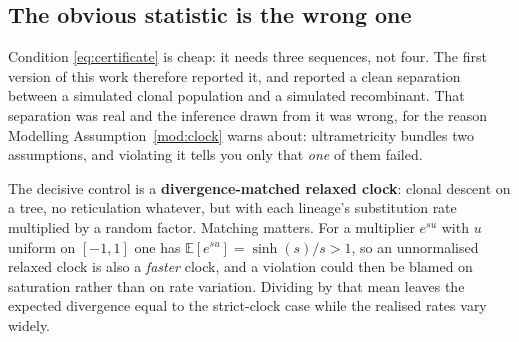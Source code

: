 \subsection{The obvious statistic is the wrong one}\label{sub:relaxed}

Condition \eqref{eq:certificate} is cheap: it needs three sequences, not four.
The first version of this work therefore reported it, and reported a clean
separation between a simulated clonal population and a simulated recombinant.
That separation was real and the inference drawn from it was wrong, for the
reason Modelling Assumption~\ref{mod:clock} warns about: ultrametricity bundles
two assumptions, and violating it tells you only that \emph{one} of them failed.

The decisive control is a \textbf{divergence-matched relaxed clock}: clonal
descent on a tree, no reticulation whatever, but with each lineage's substitution
rate multiplied by a random factor. Matching matters. For a multiplier
$e^{s u}$ with $u$ uniform on $[-1,1]$ one has
$\mathbb{E}[e^{su}] = \sinh(s)/s > 1$, so an unnormalised relaxed clock is also
a \emph{faster} clock, and a violation could then be blamed on saturation rather
than on rate variation. Dividing by that mean leaves the expected divergence
equal to the strict-clock case while the realised rates vary widely.


